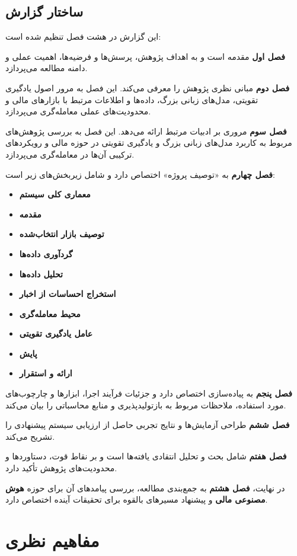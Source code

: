 \documentclass[12pt, a4paper]{report}
\begin{document}
\section{ساختار گزارش}

این گزارش در هشت فصل تنظیم شده است:  

\textbf{فصل اول} مقدمه است و به اهداف پژوهش، پرسش‌ها و فرضیه‌ها، اهمیت عملی و دامنه مطالعه می‌پردازد.  

\textbf{فصل دوم} مبانی نظری پژوهش را معرفی می‌کند. این فصل به مرور اصول یادگیری تقویتی، مدل‌های زبانی بزرگ، داده‌ها و اطلاعات مرتبط با بازارهای مالی و محدودیت‌های عملی معامله‌گری می‌پردازد.

\textbf{فصل سوم} مروری بر ادبیات مرتبط ارائه می‌دهد. این فصل به بررسی پژوهش‌های مربوط به کاربرد مدل‌های زبانی بزرگ و یادگیری تقویتی در حوزه مالی و رویکردهای ترکیبی آن‌ها در معامله‌گری می‌پردازد.

\textbf{فصل چهارم} به «توصیف پروژه» اختصاص دارد و شامل زیربخش‌های زیر است:
\begin{itemize}
    \item \textbf{معماری کلی سیستم}
    \item \textbf{مقدمه}
    \item \textbf{توصیف بازار انتخاب‌شده}
    \item \textbf{گردآوری داده‌ها}
    \item \textbf{تحلیل داده‌ها}
    \item \textbf{استخراج احساسات از اخبار}
    \item \textbf{محیط معامله‌گری}
    \item \textbf{عامل یادگیری تقویتی}
    \item \textbf{پایش}
    \item \textbf{ارائه و استقرار}
\end{itemize}

\textbf{فصل پنجم} به پیاده‌سازی اختصاص دارد و جزئیات فرآیند اجرا، ابزارها و چارچوب‌های مورد استفاده، ملاحظات مربوط به بازتولیدپذیری و منابع محاسباتی را بیان می‌کند.  

\textbf{فصل ششم} طراحی آزمایش‌ها و نتایج تجربی حاصل از ارزیابی سیستم پیشنهادی را تشریح می‌کند.  

\textbf{فصل هفتم} شامل بحث و تحلیل انتقادی یافته‌ها است و بر نقاط قوت، دستاوردها و محدودیت‌های پژوهش تأکید دارد.  

در نهایت، \textbf{فصل هشتم} به جمع‌بندی مطالعه، بررسی پیامدهای آن برای حوزه \textbf{هوش مصنوعی مالی} و پیشنهاد مسیرهای بالقوه برای تحقیقات آینده اختصاص دارد.  


\chapter{مفاهیم نظری}
\end{document}
